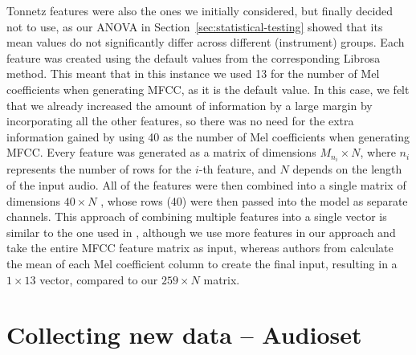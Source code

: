 Tonnetz features were also the ones we initially considered, but finally decided not to use, as our ANOVA in Section~\ref{sec:statistical-testing} showed that its mean values do not significantly differ across different (instrument) groups. Each feature was created using the default values from the corresponding Librosa method. This meant that in this instance we used 13 for the number of Mel coefficients when generating MFCC, as it is the default value. In this case, we felt that we already increased the amount of information by a large margin by incorporating all the other features, so there was no need for the extra information gained by using 40 as the number of Mel coefficients when generating MFCC. Every feature was generated as a matrix of dimensions {$M_{n_i} \times N$}, where {$n_i$} represents the number of rows for the $i$-th feature, and $N$ depends on the length of the input audio. All of the features were then combined into a single matrix of dimensions $40 \times N$ , whose rows (40) were then passed into the model as separate channels. This approach of combining multiple features into a single vector is similar to the one used in \cite{Racharla_2020}, although we use more features in our approach and take the entire MFCC feature matrix as input, whereas authors from \cite{Racharla_2020} calculate the mean of each Mel coefficient column to create the final input, resulting in a $1 \times 13$ vector, compared to our $259 \times N$ matrix.

\section{Collecting new data -- Audioset}
\label{sec:data-prep:collecting-audioset}

